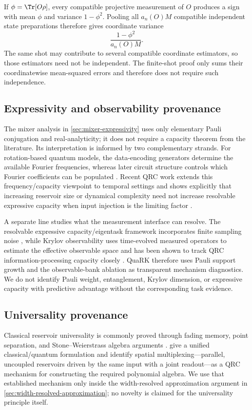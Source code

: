 If $\phi=\Tr[O\rho]$, every compatible projective measurement of $O$ produces
a sign with mean $\phi$ and variance $1-\phi^2$. Pooling all $a_n(O)M$
compatible independent state preparations therefore gives coordinate
variance
\[
    \frac{1-\phi^2}{a_n(O)M}.
\]
The same shot may contribute to several compatible coordinate estimators, so
those estimators need not be independent. The finite-shot proof only sums
their coordinatewise mean-squared errors and therefore does not require such
independence.

\subsection{Expressivity and observability provenance}

The mixer analysis in \cref{sec:mixer-expressivity} uses only elementary Pauli
conjugation and real-analyticity; it does not require a capacity theorem from
the literature.  Its interpretation is informed by two complementary strands.
For rotation-based quantum models, the data-encoding generators determine the
available Fourier frequencies, whereas later circuit structure controls which
Fourier coefficients can be populated \citep{SchuldSwekeMeyer2021}.  Recent
QRC work extends this frequency/capacity viewpoint to temporal settings and
shows explicitly that increasing reservoir size or dynamical complexity need
not increase resolvable expressive capacity when input injection is the
limiting factor \citep{SchuetteEtAl2026}.

A separate line studies what the measurement interface can resolve.  The
resolvable expressive capacity/eigentask framework incorporates finite
sampling noise \citep{HuEtAl2023Eigentasks}, while Krylov observability uses
time-evolved measured operators to estimate the effective observable space and
has been shown to track QRC information-processing capacity closely
\citep{CindrakLudgeJaurigue2025,CindrakJaurigueLudge2025}.  QuaRK therefore
uses Pauli support growth and the observable-bank ablation as transparent
mechanism diagnostics.  We do not identify Pauli weight, entanglement, Krylov
dimension, or expressive capacity with predictive advantage without the
corresponding task evidence.

\subsection{Universality provenance}

Classical reservoir universality is commonly proved through fading memory,
point separation, and Stone--Weierstrass algebra arguments
\citep{GrigoryevaOrtega2018}. \citet{MonzaniPrati2025} give a unified
classical/quantum formulation and identify spatial multiplexing---parallel,
uncoupled reservoirs driven by the same input with a joint readout---as a QRC
mechanism for constructing the required polynomial algebra. We use that
established mechanism only inside the width-resolved approximation argument in
\cref{sec:width-resolved-approximation}; no novelty is claimed for the
universality principle itself.

